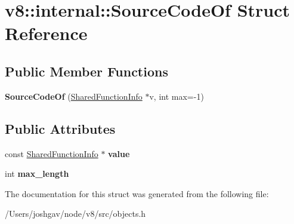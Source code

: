 \hypertarget{structv8_1_1internal_1_1_source_code_of}{}\section{v8\+:\+:internal\+:\+:Source\+Code\+Of Struct Reference}
\label{structv8_1_1internal_1_1_source_code_of}
\subsection*{Public Member Functions}
\begin{DoxyCompactItemize}
\item 
{\bfseries Source\+Code\+Of} (\hyperlink{classv8_1_1internal_1_1_shared_function_info}{Shared\+Function\+Info} $\ast$v, int max=-\/1)\hypertarget{structv8_1_1internal_1_1_source_code_of_a353fda7f55d77a8cb35e6774c65ac151}{}\label{structv8_1_1internal_1_1_source_code_of_a353fda7f55d77a8cb35e6774c65ac151}

\end{DoxyCompactItemize}
\subsection*{Public Attributes}
\begin{DoxyCompactItemize}
\item 
const \hyperlink{classv8_1_1internal_1_1_shared_function_info}{Shared\+Function\+Info} $\ast$ {\bfseries value}\hypertarget{structv8_1_1internal_1_1_source_code_of_ac60e3e84fe5b71bc3a19dcf0cb7fbbe8}{}\label{structv8_1_1internal_1_1_source_code_of_ac60e3e84fe5b71bc3a19dcf0cb7fbbe8}

\item 
int {\bfseries max\+\_\+length}\hypertarget{structv8_1_1internal_1_1_source_code_of_abbb1e68e0622cae35e67653d7ede0560}{}\label{structv8_1_1internal_1_1_source_code_of_abbb1e68e0622cae35e67653d7ede0560}

\end{DoxyCompactItemize}


The documentation for this struct was generated from the following file\+:\begin{DoxyCompactItemize}
\item 
/\+Users/joshgav/node/v8/src/objects.\+h\end{DoxyCompactItemize}
